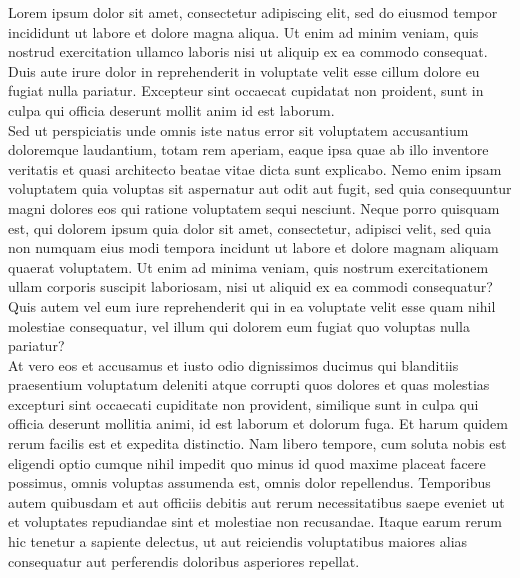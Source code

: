 
Lorem ipsum dolor sit amet, consectetur adipiscing elit, sed do eiusmod tempor incididunt ut labore et dolore magna aliqua. Ut enim ad minim veniam, quis nostrud exercitation ullamco laboris nisi ut aliquip ex ea commodo consequat. Duis aute irure dolor in reprehenderit in voluptate velit esse cillum dolore eu fugiat nulla pariatur. Excepteur sint occaecat cupidatat non proident, sunt in culpa qui officia deserunt mollit anim id est laborum. \\

Sed ut perspiciatis unde omnis iste natus error sit voluptatem accusantium doloremque laudantium, totam rem aperiam, eaque ipsa quae ab illo inventore veritatis et quasi architecto beatae vitae dicta sunt explicabo. Nemo enim ipsam voluptatem quia voluptas sit aspernatur aut odit aut fugit, sed quia consequuntur magni dolores eos qui ratione voluptatem sequi nesciunt. Neque porro quisquam est, qui dolorem ipsum quia dolor sit amet, consectetur, adipisci velit, sed quia non numquam eius modi tempora incidunt ut labore et dolore magnam aliquam quaerat voluptatem. Ut enim ad minima veniam, quis nostrum exercitationem ullam corporis suscipit laboriosam, nisi ut aliquid ex ea commodi consequatur? Quis autem vel eum iure reprehenderit qui in ea voluptate velit esse quam nihil molestiae consequatur, vel illum qui dolorem eum fugiat quo voluptas nulla pariatur? \\

At vero eos et accusamus et iusto odio dignissimos ducimus qui blanditiis praesentium voluptatum deleniti atque corrupti quos dolores et quas molestias excepturi sint occaecati cupiditate non provident, similique sunt in culpa qui officia deserunt mollitia animi, id est laborum et dolorum fuga. Et harum quidem rerum facilis est et expedita distinctio. Nam libero tempore, cum soluta nobis est eligendi optio cumque nihil impedit quo minus id quod maxime placeat facere possimus, omnis voluptas assumenda est, omnis dolor repellendus. Temporibus autem quibusdam et aut officiis debitis aut rerum necessitatibus saepe eveniet ut et voluptates repudiandae sint et molestiae non recusandae. Itaque earum rerum hic tenetur a sapiente delectus, ut aut reiciendis voluptatibus maiores alias consequatur aut perferendis doloribus asperiores repellat.

